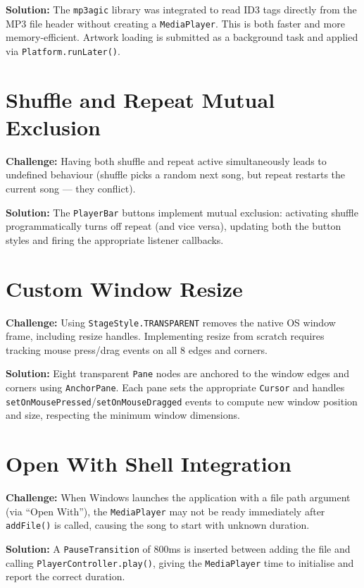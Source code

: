 ﻿\documentclass[12pt]{report}
\begin{document}
\textbf{Solution:} The \texttt{mp3agic} library was integrated to read ID3 tags directly from the MP3 file header without creating a \texttt{MediaPlayer}. This is both faster and more memory-efficient. Artwork loading is submitted as a background task and applied via \texttt{Platform.runLater()}.

\section{Shuffle and Repeat Mutual Exclusion}
\textbf{Challenge:} Having both shuffle and repeat active simultaneously leads to undefined behaviour (shuffle picks a random next song, but repeat restarts the current song --- they conflict).

\textbf{Solution:} The \texttt{PlayerBar} buttons implement mutual exclusion: activating shuffle programmatically turns off repeat (and vice versa), updating both the button styles and firing the appropriate listener callbacks.

\section{Custom Window Resize}
\textbf{Challenge:} Using \texttt{StageStyle.TRANSPARENT} removes the native OS window frame, including resize handles. Implementing resize from scratch requires tracking mouse press/drag events on all 8 edges and corners.

\textbf{Solution:} Eight transparent \texttt{Pane} nodes are anchored to the window edges and corners using \texttt{AnchorPane}. Each pane sets the appropriate \texttt{Cursor} and handles \texttt{setOnMousePressed}/\texttt{setOnMouseDragged} events to compute new window position and size, respecting the minimum window dimensions.

\section{Open With Shell Integration}
\textbf{Challenge:} When Windows launches the application with a file path argument (via ``Open With''), the \texttt{MediaPlayer} may not be ready immediately after \texttt{addFile()} is called, causing the song to start with unknown duration.

\textbf{Solution:} A \texttt{PauseTransition} of 800ms is inserted between adding the file and calling \texttt{PlayerController.play()}, giving the \texttt{MediaPlayer} time to initialise and report the correct duration.
\end{document}
